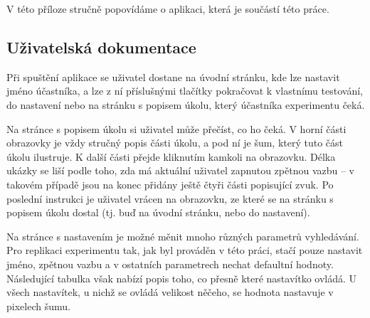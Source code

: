 \newpage
{}

V této příloze stručně popovídáme o aplikaci, která je součástí této práce. 

\subsection*{Uživatelská dokumentace}

Při spuštění aplikace se uživatel dostane na úvodní stránku, kde lze nastavit
jméno účastníka, a lze z ní příslušnými tlačítky pokračovat k vlastnímu
testování, do nastavení nebo na stránku s popisem úkolu, který účastníka
experimentu čeká.

Na stránce s popisem úkolu si uživatel může přečíst, co ho čeká. V horní části
obrazovky je vždy stručný popis části úkolu, a pod ní je šum, který tuto část
úkolu ilustruje. K další části přejde kliknutím kamkoli na obrazovku. Délka
ukázky se liší podle toho, zda má aktuální uživatel zapnutou zpětnou vazbu -- v
takovém případě jsou na konec přidány ještě čtyři části popisující zvuk. Po
poslední instrukci je uživatel vrácen na obrazovku, ze které se na stránku s
popisem úkolu dostal (tj. buď na úvodní stránku, nebo do nastavení).

Na stránce s nastavením je možné měnit mnoho různých parametrů vyhledávání. Pro
replikaci experimentu tak, jak byl prováděn v této práci, stačí pouze nastavit
jméno, zpětnou vazbu a v ostatních parametrech nechat defaultní hodnoty.
Následující tabulka však nabízí popis toho, co přesně které nastavítko ovládá.
U všech nastavítek, u nichž se ovládá velikost něčeho,
se hodnota nastavuje v pixelech šumu.
\bigskip

